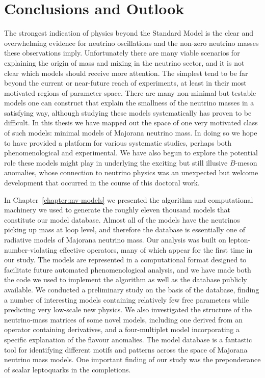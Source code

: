 \graphicspath{{img/chapter_6/}}

\chapter{Conclusions and Outlook}
\label{chapter:conclusions}

The strongest indication of physics beyond the Standard Model is the clear and
overwhelming evidence for neutrino oscillations and the non-zero neutrino masses
these observations imply. Unfortunately there are many viable scenarios for
explaining the origin of mass and mixing in the neutrino sector, and it is not
clear which models should receive more attention. The simplest tend to be far
beyond the current or near-future reach of experiments, at least in their most
motivated regions of parameter space. There are many non-minimal but testable
models one can construct that explain the smallness of the neutrino masses in a
satisfying way, although studying these models systematically has proven to be
difficult. In this thesis we have mapped out the space of one very motivated
class of such models: minimal models of Majorana neutrino mass. In doing so we
hope to have provided a platform for various systematic studies, perhaps both
phenomenological and experimental. We have also begun to explore the potential
role these models might play in underlying the exciting but still illusive
$B$-meson anomalies, whose connection to neutrino physics was an unexpected but
welcome development that occurred in the course of this doctoral work.

In Chapter~\ref{chapter:mv-models} we presented the algorithm and computational
machinery we used to generate the roughly eleven thousand models that constitute
our model database. Almost all of the models have the neutrinos picking up mass
at loop level, and therefore the database is essentially one of radiative models
of Majorana neutrino mass. Our analysis was built on lepton-number-violating
effective operators, many of which appear for the first time in our study. The
models are represented in a computational format designed to facilitate future
automated phenomenological analysis, and we have made both the code we used to
implement the algorithm as well as the database publicly available. We conducted
a preliminary study on the basis of the database, finding a number of
interesting models containing relatively few free parameters while predicting
very low-scale new physics. We also investigated the structure of the
neutrino-mass matrices of some novel models, including one derived from an
operator containing derivatives, and a four-multiplet model incorporating a
specific explanation of the flavour anomalies. The model database is a fantastic
tool for identifying different motifs and patterns across the space of Majorana
neutrino mass models. One important finding of our study was the preponderance
of scalar leptoquarks in the completions.

